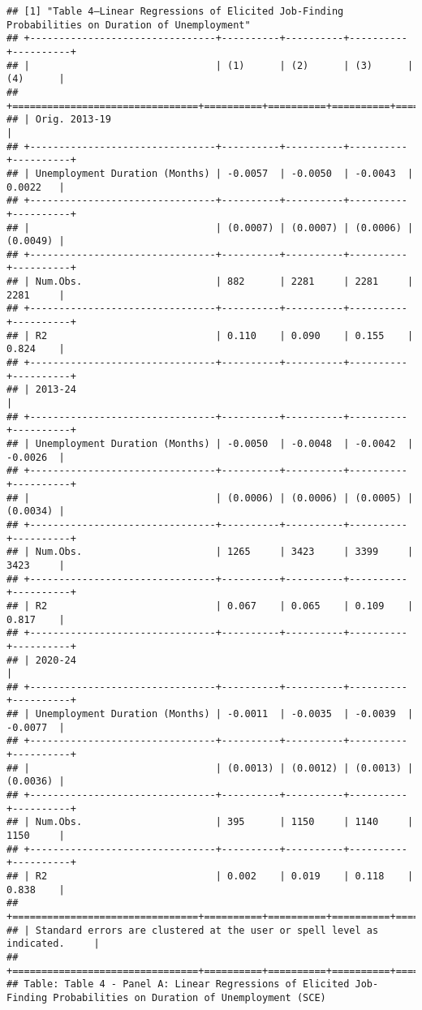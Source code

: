 \begin{verbatim}
## [1] "Table 4—Linear Regressions of Elicited Job-Finding Probabilities on Duration of Unemployment"
## +--------------------------------+----------+----------+----------+----------+
## |                                | (1)      | (2)      | (3)      | (4)      |
## +================================+==========+==========+==========+==========+
## | Orig. 2013-19                                                              |
## +--------------------------------+----------+----------+----------+----------+
## | Unemployment Duration (Months) | -0.0057  | -0.0050  | -0.0043  | 0.0022   |
## +--------------------------------+----------+----------+----------+----------+
## |                                | (0.0007) | (0.0007) | (0.0006) | (0.0049) |
## +--------------------------------+----------+----------+----------+----------+
## | Num.Obs.                       | 882      | 2281     | 2281     | 2281     |
## +--------------------------------+----------+----------+----------+----------+
## | R2                             | 0.110    | 0.090    | 0.155    | 0.824    |
## +--------------------------------+----------+----------+----------+----------+
## | 2013-24                                                                    |
## +--------------------------------+----------+----------+----------+----------+
## | Unemployment Duration (Months) | -0.0050  | -0.0048  | -0.0042  | -0.0026  |
## +--------------------------------+----------+----------+----------+----------+
## |                                | (0.0006) | (0.0006) | (0.0005) | (0.0034) |
## +--------------------------------+----------+----------+----------+----------+
## | Num.Obs.                       | 1265     | 3423     | 3399     | 3423     |
## +--------------------------------+----------+----------+----------+----------+
## | R2                             | 0.067    | 0.065    | 0.109    | 0.817    |
## +--------------------------------+----------+----------+----------+----------+
## | 2020-24                                                                    |
## +--------------------------------+----------+----------+----------+----------+
## | Unemployment Duration (Months) | -0.0011  | -0.0035  | -0.0039  | -0.0077  |
## +--------------------------------+----------+----------+----------+----------+
## |                                | (0.0013) | (0.0012) | (0.0013) | (0.0036) |
## +--------------------------------+----------+----------+----------+----------+
## | Num.Obs.                       | 395      | 1150     | 1140     | 1150     |
## +--------------------------------+----------+----------+----------+----------+
## | R2                             | 0.002    | 0.019    | 0.118    | 0.838    |
## +================================+==========+==========+==========+==========+
## | Standard errors are clustered at the user or spell level as indicated.     |
## +================================+==========+==========+==========+==========+
## Table: Table 4 - Panel A: Linear Regressions of Elicited Job-Finding Probabilities on Duration of Unemployment (SCE)
\end{verbatim}

